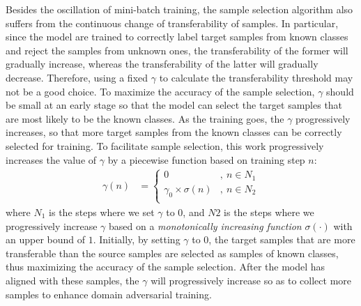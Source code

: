 {Besides the oscillation of mini-batch training, the sample selection algorithm also suffers from the continuous change of transferability of samples. 
In particular, since the model are trained to correctly label target samples from known classes and reject the samples from unknown ones, the transferability of the former will gradually increase, whereas the transferability of the latter will gradually decrease. 
Therefore, using a fixed $\gamma$ to calculate the transferability threshold may not be a good choice. 
To maximize the accuracy of the sample selection, $\gamma$ should be small at an early stage so that the model can select the target samples that are most likely to be the known classes. 
As the training goes, the $\gamma$ progressively increases, so that more target samples from the known classes can be correctly selected for training. 
To facilitate sample selection, this work progressively increases the value of $\gamma$ by a piecewise function based on training step $n$:
\begin{equation}  
    \label{eq: dynamic tolerable range}
    \begin{split}
        \gamma(n) &= 
        \begin{cases}
            0 & ,\: n \in N_1 \\
            \gamma_0 \times  \sigma(n) & ,\: n\in N_2 \\ 
        \end{cases}
    \end{split}
\end{equation}
where $N_1$ is the steps where we set $\gamma$ to $0$, and $N2$ is the steps where we progressively increase $\gamma$ based on a \textit{monotonically increasing function} $\sigma(\cdot)$ with an upper bound of $1$. 
Initially, by setting $\gamma$ to $0$, the target samples that are more transferable than the source samples are selected as samples of known classes, thus maximizing the accuracy of the sample selection. 
After the model has aligned with these samples, the $\gamma$ will progressively increase so as to collect more samples to enhance domain adversarial training. 



}
